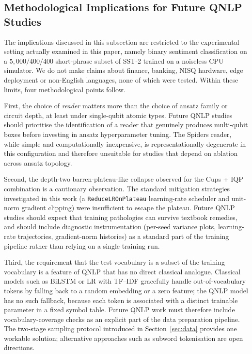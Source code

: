 \documentclass[11pt, a4paper]{article}
\begin{document}
\subsection{Methodological Implications for Future QNLP Studies}

The implications discussed in this subsection are restricted to the
experimental setting actually examined in this paper, namely binary
sentiment classification on a \(5{,}000/400/400\) short-phrase
subset of SST-2 trained on a noiseless CPU simulator. We do not
make claims about finance, banking, NISQ hardware, edge deployment
or non-English languages, none of which were tested. Within these
limits, four methodological points follow.

First, the choice of \emph{reader} matters more than the choice of
ansatz family or circuit depth, at least under single-qubit atomic
types. Future QNLP studies should prioritise the identification of
a reader that genuinely produces multi-qubit boxes before investing
in ansatz hyperparameter tuning. The Spiders reader, while simple
and computationally inexpensive, is representationally degenerate in
this configuration and therefore unsuitable for studies that depend
on ablation across ansatz topology.

Second, the depth-two barren-plateau-like collapse observed for the
Cups + IQP combination is a cautionary observation. The standard
mitigation strategies investigated in this work (a
\texttt{ReduceLROnPlateau} learning-rate scheduler and unit-norm
gradient clipping) were insufficient to escape the plateau. Future
QNLP studies should expect that training pathologies can survive
textbook remedies, and should include diagnostic instrumentation
(per-seed variance plots, learning-rate trajectories, gradient-norm
histories) as a standard part of the training pipeline rather than
relying on a single training run.

Third, the requirement that the test vocabulary is a subset of the
training vocabulary is a feature of QNLP that has no direct
classical analogue. Classical models such as BiLSTM or LR with
TF--IDF gracefully handle out-of-vocabulary tokens by falling back
to a random embedding or a zero feature; the QNLP model has no such
fallback, because each token is associated with a distinct trainable
parameter in a fixed symbol table. Future QNLP work must therefore
include vocabulary-coverage checks as an explicit part of the data
preparation pipeline. The two-stage sampling protocol introduced in
Section~\ref{sec:data} provides one workable solution; alternative
approaches such as subword tokenisation are open directions.
\end{document}
